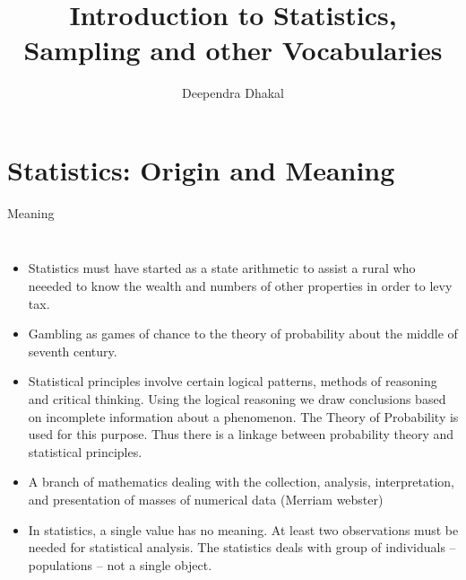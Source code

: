 \documentclass[
  ignorenonframetext,
  aspectratio=169]{beamer}
\title{Introduction to Statistics, Sampling and other Vocabularies}
\author{Deependra Dhakal}
\date{}
\institute{Assistant Professor \and Agriculture and Forestry
University \and \url{https://rookie.rbind.io}}
\begin{document}
\frame{\titlepage}

\begin{frame}[allowframebreaks]
  \tableofcontents[hideallsubsections]
\end{frame}
\hypertarget{statistics-origin-and-meaning}{%
\section{Statistics: Origin and
Meaning}\label{statistics-origin-and-meaning}}

\begin{frame}{Meaning}
\protect\hypertarget{meaning}{}
\begin{columns}

\begin{itemize}
\small
\item Statistics must have started as a state arithmetic to assist a rural who neeeded to know the wealth and numbers of other properties in order to levy tax.
\item Gambling as games of chance to the theory of probability about the middle of seventh century.
\item Statistical principles involve certain logical patterns, methods of reasoning and critical thinking. Using the logical reasoning we draw conclusions based on incomplete information about a phenomenon. The Theory of Probability is used for this purpose. Thus there is a linkage between probability theory and statistical principles.
\item A branch of mathematics dealing with the collection, analysis, interpretation, and presentation of masses of numerical data (Merriam webster)
\item In statistics, a single value has no meaning. At least two observations must be needed for statistical analysis. The statistics deals with group of individuals -- populations -- not a single object.
\end{itemize}


\end{columns}
\end{frame}
\end{document}
